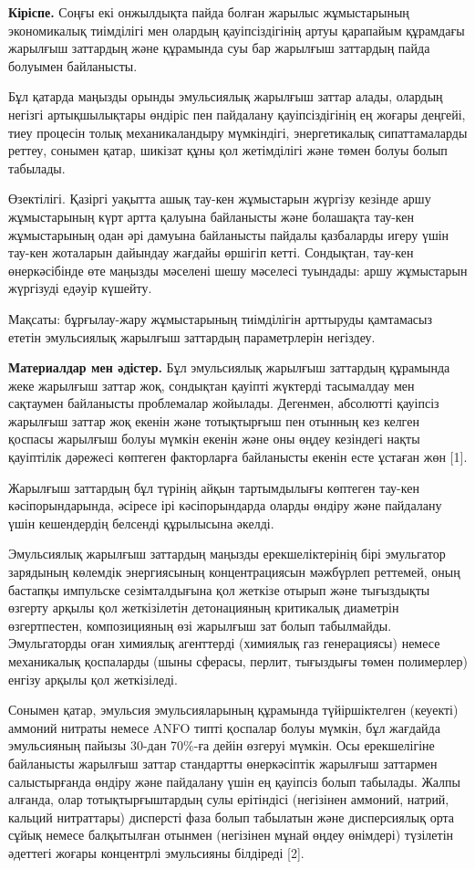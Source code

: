 \begin{multicols}{2}
{\bfseries Кіріспе.} Соңғы екі онжылдықта пайда болған жарылыс жұмыстарының
экономикалық тиімділігі мен олардың қауіпсіздігінің артуы қарапайым
құрамдағы жарылғыш заттардың және құрамында суы бар жарылғыш заттардың
пайда болуымен байланысты.

Бұл қатарда маңызды орынды эмульсиялық жарылғыш заттар алады, олардың
негізгі артықшылықтары өндіріс пен пайдалану қауіпсіздігінің ең жоғары
деңгейі, тиеу процесін толық механикаландыру мүмкіндігі, энергетикалық
сипаттамаларды реттеу, сонымен қатар, шикізат құны қол жетімділігі және
төмен болуы болып табылады.

Өзектілігі. Қазіргі уақытта ашық тау-кен жұмыстарын жүргізу кезінде аршу
жұмыстарының күрт артта қалуына байланысты және болашақта тау-кен
жұмыстарының одан әрі дамуына байланысты пайдалы қазбаларды игеру үшін
тау-кен жоталарын дайындау жағдайы өршігіп кетті. Сондықтан, тау-кен
өнеркәсібінде өте маңызды мәселені шешу мәселесі туындады: аршу
жұмыстарын жүргізуді едәуір күшейту.

Мақсаты: бұрғылау-жару жұмыстарының тиімділігін арттыруды қамтамасыз
ететін эмульсиялық жарылғыш заттардың параметрлерін негіздеу.

{\bfseries Материалдар мен әдістер.} Бұл эмульсиялық жарылғыш заттардың
құрамында жеке жарылғыш заттар жоқ, сондықтан қауіпті жүктерді
тасымалдау мен сақтаумен байланысты проблемалар жойылады. Дегенмен,
абсолютті қауіпсіз жарылғыш заттар жоқ екенін және тотықтырғыш пен
отынның кез келген қоспасы жарылғыш болуы мүмкін екенін және оны өңдеу
кезіндегі нақты қауіптілік дәрежесі көптеген факторларға байланысты
екенін есте ұстаған жөн {[}1{]}.

Жарылғыш заттардың бұл түрінің айқын тартымдылығы көптеген тау-кен
кәсіпорындарында, әсіресе ірі кәсіпорындарда оларды өндіру және
пайдалану үшін кешендердің белсенді құрылысына әкелді.

Эмульсиялық жарылғыш заттардың маңызды ерекшеліктерінің бірі эмульгатор
зарядының көлемдік энергиясының концентрациясын мәжбүрлеп реттемей, оның
бастапқы импульске сезімталдығына қол жеткізе отырып және тығыздықты
өзгерту арқылы қол жеткізілетін детонацияның критикалық диаметрін
өзгертпестен, композицияның өзі жарылғыш зат болып табылмайды.
Эмульгаторды оған химиялық агенттерді (химиялық газ генерациясы) немесе
механикалық қоспаларды (шыны сферасы, перлит, тығыздығы төмен
полимерлер) енгізу арқылы қол жеткізіледі.

Сонымен қатар, эмульсия эмульсияларының құрамында түйіршіктелген
(кеуекті) аммоний нитраты немесе ANFO типті қоспалар болуы мүмкін, бұл
жағдайда эмульсияның пайызы 30-дан 70\%-ға дейін өзгеруі мүмкін. Осы
ерекшелігіне байланысты жарылғыш заттар стандартты өнеркәсіптік жарылғыш
заттармен салыстырғанда өндіру және пайдалану үшін ең қауіпсіз болып
табылады. Жалпы алғанда, олар тотықтырғыштардың сулы ерітіндісі
(негізінен аммоний, натрий, кальций нитраттары) дисперсті фаза болып
табылатын және дисперсиялық орта сұйық немесе балқытылған отынмен
(негізінен мұнай өңдеу өнімдері) түзілетін әдеттегі жоғары концентрлі
эмульсияны білдіреді {[}2{]}.


\end{multicols}
